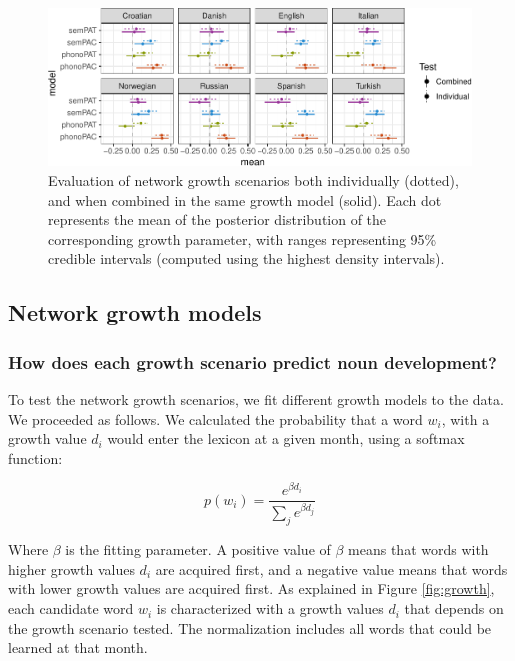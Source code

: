 \documentclass[10pt, letterpaper]{article}
\newenvironment{CodeChunk}{}{}
\begin{document}
\begin{CodeChunk}
\begin{figure}[h]

{\centering \includegraphics{figs/pred_ind_img-1} 

}

\caption{\label{fig:pred_ind}Evaluation of network growth scenarios both individually (dotted), and when combined in the same growth model (solid). Each dot represents the mean of the posterior distribution of the corresponding growth parameter, with ranges representing 95\% credible intervals (computed using the highest density intervals).}\label{fig:pred_ind_img}
\end{figure}
\end{CodeChunk}

\subsection{Network growth models}\label{network-growth-models}

\subsubsection{How does each growth scenario predict noun
development?}\label{how-does-each-growth-scenario-predict-noun-development}

To test the network growth scenarios, we fit different growth models to
the data. We proceeded as follows. We calculated the probability that a
word \(w_i\), with a growth value \(d_i\) would enter the lexicon at a
given month, using a softmax function:

\begin{equation}
 p(w_i)= \frac{e^{\beta d_i}}{\sum_j e^{\beta d_j} }
\end{equation}

Where \(\beta\) is the fitting parameter. A positive value of \(\beta\)
means that words with higher growth values \(d_i\) are acquired first,
and a negative value means that words with lower growth values are
acquired first. As explained in Figure \ref{fig:growth}, each candidate
word \(w_i\) is characterized with a growth values \(d_i\) that depends
on the growth scenario tested. The normalization includes all words that
could be learned at that month.
\end{document}
